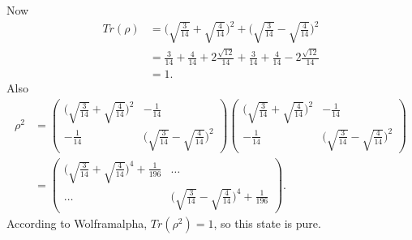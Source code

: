 \documentclass[10pt]{article}
\begin{document}
Now
\begin{align*}
Tr(\rho) &= \Bigg( \sqrt{\frac{3}{14}} + \sqrt{\frac{4}{14}} \Bigg)^2 + \Bigg( \sqrt{\frac{3}{14}} - \sqrt{\frac{4}{14}} \Bigg)^2 \\
             &= \frac{3}{14} + \frac{4}{14} + 2\frac{\sqrt{12}}{14} + \frac{3}{14} + \frac{4}{14} -2 \frac{\sqrt{12}}{14} \\
             &= 1.
\end{align*}
Also
\begin{align*}
\rho^2 &= \begin{pmatrix}
        \Bigg( \sqrt{\frac{3}{14}} + \sqrt{\frac{4}{14}} \Bigg)^2 & -\frac{1}{14} \\
        -\frac{1}{14} & \Bigg( \sqrt{\frac{3}{14}} - \sqrt{\frac{4}{14}} \Bigg)^2
        \end{pmatrix}
        \begin{pmatrix}
        \Bigg( \sqrt{\frac{3}{14}} + \sqrt{\frac{4}{14}} \Bigg)^2 & -\frac{1}{14} \\
        -\frac{1}{14} & \Bigg( \sqrt{\frac{3}{14}} - \sqrt{\frac{4}{14}} \Bigg)^2
        \end{pmatrix} \\
        &= \begin{pmatrix}
        \Bigg( \sqrt{\frac{3}{14}} + \sqrt{\frac{4}{14}} \Bigg)^4 + \frac{1}{196} & \dots \\
        \dots & \Bigg( \sqrt{\frac{3}{14}} - \sqrt{\frac{4}{14}} \Bigg)^4 + \frac{1}{196}
        \end{pmatrix}.
\end{align*}
According to Wolframalpha, $Tr(\rho^2) = 1$, so this state is pure.
\end{document}
